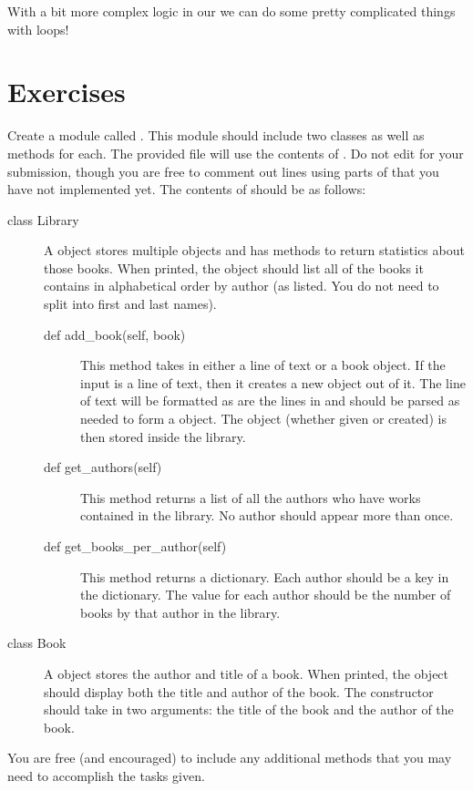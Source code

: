 \documentclass[11pt]{cselabheader}
\begin{document}
With a bit more complex logic in our  we can do some
pretty complicated things with  loops!

\clearpage
\section{Exercises}
\label{sec:ex}

\begin{ex}[library.py]
    Create a module called . This module should include
    two classes as well as methods for each. The provided file
     will use the contents of
    . Do not edit  for
    your submission, though you are free to comment out lines using parts of
     that you have not implemented yet. The contents of
     should be as follows:

    \begin{description}
    \item[class Library] A  object stores multiple
        objects and has methods to return statistics about those books. When
        printed, the object should list all of the books it contains in
        alphabetical order by author (as listed. You do not need to split into
        first and last names).
        \begin{description}
        \item[def add\_book(self, book)] This method takes in either a line of
            text or a book object. If the input is a line of text, then it
            creates a new  object out of it. The line of
            text will be formatted as are the lines in 
            and should be parsed as needed to form a  object.
            The object (whether given or created) is then stored inside the
            library.
        \item[def get\_authors(self)] This method returns a list of all the
            authors who have works contained in the library. No author should
            appear more than once.
        \item[def get\_books\_per\_author(self)] This method returns a
            dictionary.
            Each author should be a key in the dictionary. The value for each
            author should be the number of books by that author in the library.
        \end{description}
    \item[class Book] A  object stores the author and title
        of a book. When printed, the object should display both the title and
        author of the book. The constructor should take in two arguments:
        the title of the book and the author of the book.
    \end{description}

    You are free (and encouraged) to include any additional methods that you may
    need to accomplish the tasks given.
\end{ex}
\end{document}
